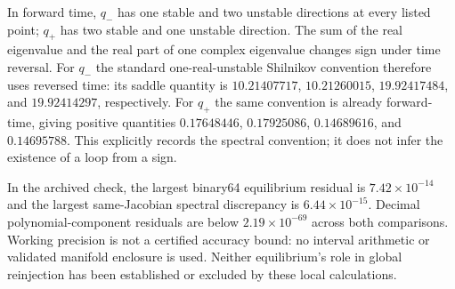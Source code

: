 In forward time, $q_-$ has one stable and two unstable directions at every
listed point; $q_+$ has two stable and one unstable direction. The sum of
the real eigenvalue and the real part of one complex eigenvalue changes
sign under time reversal. For $q_-$ the standard one-real-unstable
Shilnikov convention therefore uses reversed time: its saddle quantity is
$10.21407717$, $10.21260015$, $19.92417484$, and $19.92414297$, respectively.
For $q_+$ the same convention is already forward-time, giving positive
quantities $0.17648446$, $0.17925086$, $0.14689616$, and $0.14695788$.
This explicitly records the spectral convention; it does not infer the
existence of a loop from a sign.

In the archived check, the largest binary64 equilibrium residual is
$7.42\times10^{-14}$ and the largest same-Jacobian spectral discrepancy
is $6.44\times10^{-15}$. Decimal polynomial-component residuals are below
$2.19\times10^{-69}$ across both comparisons. Working precision is not a certified accuracy bound:
no interval arithmetic or validated manifold enclosure is used. Neither
equilibrium's role in global reinjection has been established or excluded
by these local calculations.
